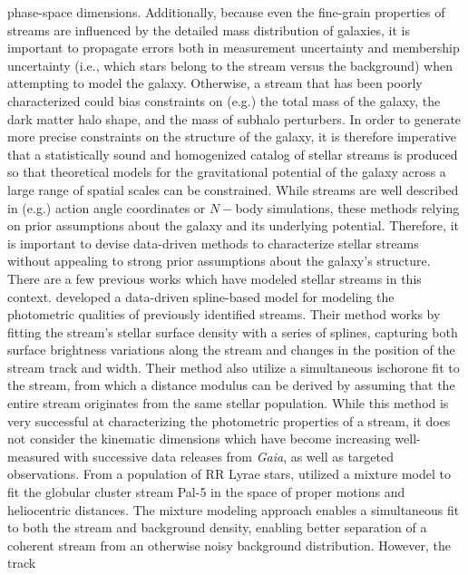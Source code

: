 \documentclass[twocolumn]{aastex631}
\begin{document}
    phase-space dimensions. Additionally, because even the fine-grain properties
    of streams are influenced by the detailed mass distribution of galaxies, it
    is important to propagate errors both in measurement uncertainty and
    membership uncertainty (i.e., which stars belong to the stream versus the
    background) when attempting to model the galaxy. Otherwise, a stream that
    has been poorly characterized could bias constraints on (e.g.) the total
    mass of the galaxy, the dark matter halo shape, and the mass of subhalo
    perturbers. In order to generate more precise constraints on the structure
    of the galaxy, it is therefore imperative that a statistically sound and
    homogenized catalog of stellar streams is produced so that theoretical
    models for the gravitational potential of the galaxy across a large range of
    spatial scales can be constrained. 
    While streams are well described in (e.g.) action angle coordinates or
    $N-$body simulations, these methods relying on prior assumptions about the
    galaxy and its underlying potential. Therefore, it is important to devise
    data-driven methods to characterize stellar streams without appealing to
    strong prior assumptions about the galaxy's structure. 
    There are a few previous works which have modeled stellar streams in this
    context. \citet{Patrick+2022} developed a data-driven spline-based
    model for modeling the photometric qualities of previously identified
    streams. Their method works by fitting the stream's stellar surface density
    with a series of splines, capturing both surface brightness variations along
    the stream and changes in the position of the stream track and width. Their
    method also utilize a simultaneous ischorone fit to the stream, from which a
    distance modulus can be derived by assuming that the entire stream
    originates from the same stellar population. While this method is very
    successful at characterizing the photometric properties of a stream, it does
    not consider the kinematic dimensions which have become increasing
    well-measured with successive data releases from {\it Gaia}, as well as
    targeted observations. From a population of RR Lyrae stars,
    \citet{Price-Whelan+2019} utilized a mixture model to fit the globular
    cluster stream Pal-5 in the space of proper motions and heliocentric
    distances. The mixture modeling approach enables a simultaneous fit to both
    the stream and background density, enabling better separation of a coherent
    stream from an otherwise noisy background distribution. However, the track
\end{document}

